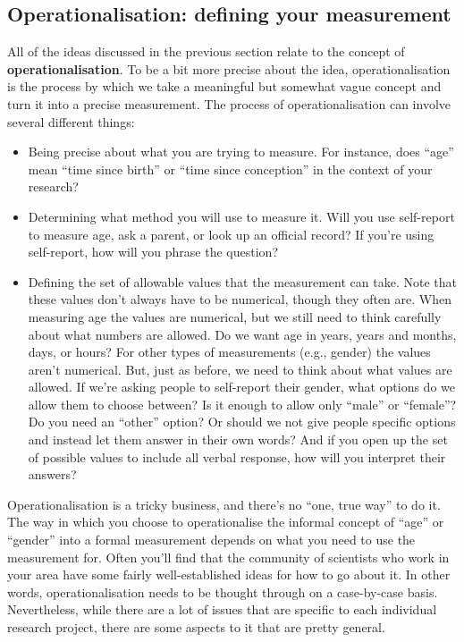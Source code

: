 \documentclass[
  a4paper,
]{book}
\begin{document}
\subsection{Operationalisation: defining your
measurement}\label{operationalisation-defining-your-measurement}

All of the ideas discussed in the previous section relate to the concept
of \textbf{operationalisation}. To be a bit more precise about the idea,
operationalisation is the process by which we take a meaningful but
somewhat vague concept and turn it into a precise measurement. The
process of operationalisation can involve several different things:

\begin{itemize}
\item
  Being precise about what you are trying to measure. For instance, does
  ``age'' mean ``time since birth'' or ``time since conception'' in the
  context of your research?
\item
  Determining what method you will use to measure it. Will you use
  self-report to measure age, ask a parent, or look up an official
  record? If you're using self-report, how will you phrase the question?
\item
  Defining the set of allowable values that the measurement can take.
  Note that these values don't always have to be numerical, though they
  often are. When measuring age the values are numerical, but we still
  need to think carefully about what numbers are allowed. Do we want age
  in years, years and months, days, or hours? For other types of
  measurements (e.g., gender) the values aren't numerical. But, just as
  before, we need to think about what values are allowed. If we're
  asking people to self-report their gender, what options do we allow
  them to choose between? Is it enough to allow only ``male'' or
  ``female''? Do you need an ``other'' option? Or should we not give
  people specific options and instead let them answer in their own
  words? And if you open up the set of possible values to include all
  verbal response, how will you interpret their answers?
\end{itemize}

Operationalisation is a tricky business, and there's no ``one, true
way'' to do it. The way in which you choose to operationalise the
informal concept of ``age'' or ``gender'' into a formal measurement
depends on what you need to use the measurement for. Often you'll find
that the community of scientists who work in your area have some fairly
well-established ideas for how to go about it. In other words,
operationalisation needs to be thought through on a case-by-case basis.
Nevertheless, while there are a lot of issues that are specific to each
individual research project, there are some aspects to it that are
pretty general.
\end{document}
